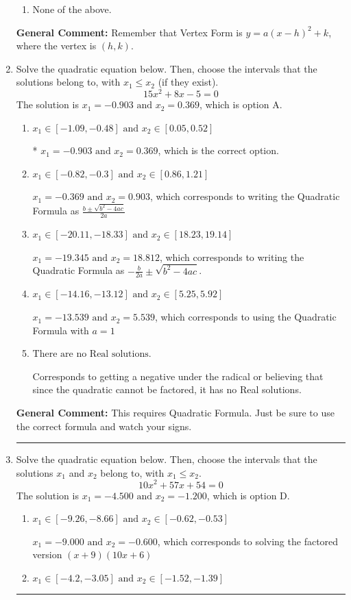 \documentclass{extbook}[14pt]
\newcommand{\litem}[1]{\item #1

\rule{\textwidth}{0.4pt}}
\begin{document}
\begin{enumerate}
{\begin{enumerate}[label=\Alph*.]
\begin{multicols}{2}
\end{multicols}\item None of the above.\end{enumerate}
\textbf{General Comment:} Remember that Vertex Form is $y = a(x-h)^2+k$, where the vertex is $(h, k)$.
}
\litem{
Solve the quadratic equation below. Then, choose the intervals that the solutions belong to, with $x_1 \leq x_2$ (if they exist).
\[ 15x^{2} +8 x -5 = 0 \]The solution is \( x_1 = -0.903 \text{ and } x_2 = 0.369 \), which is option A.\begin{enumerate}[label=\Alph*.]
\item \( x_1 \in [-1.09, -0.48] \text{ and } x_2 \in [0.05, 0.52] \)

* $x_1 = -0.903 \text{ and } x_2 = 0.369$, which is the correct option.
\item \( x_1 \in [-0.82, -0.3] \text{ and } x_2 \in [0.86, 1.21] \)

 $x_1 = -0.369 \text{ and } x_2 = 0.903$, which corresponds to writing the Quadratic Formula as $\frac{b \pm \sqrt{b^2 - 4ac}}{2a}$
\item \( x_1 \in [-20.11, -18.33] \text{ and } x_2 \in [18.23, 19.14] \)

 $x_1 = -19.345 \text{ and } x_2 = 18.812$, which corresponds to writing the Quadratic Formula as $-\frac{b}{2a} \pm \sqrt{b^2 - 4ac}$.
\item \( x_1 \in [-14.16, -13.12] \text{ and } x_2 \in [5.25, 5.92] \)

 $x_1 = -13.539 \text{ and } x_2 = 5.539$, which corresponds to using the Quadratic Formula with $a=1$
\item \( \text{There are no Real solutions.} \)

Corresponds to getting a negative under the radical or believing that since the quadratic cannot be factored, it has no Real solutions.
\end{enumerate}

\textbf{General Comment:} This requires Quadratic Formula. Just be sure to use the correct formula and watch your signs.
}
\litem{
Solve the quadratic equation below. Then, choose the intervals that the solutions $x_1$ and $x_2$ belong to, with $x_1 \leq x_2$.
\[ 10x^{2} +57 x + 54 = 0 \]The solution is \( x_1 = -4.500 \text{ and } x_2 = -1.200 \), which is option D.\begin{enumerate}[label=\Alph*.]
\item \( x_1 \in [-9.26, -8.66] \text{ and } x_2 \in [-0.62, -0.53] \)

$x_1 = -9.000 \text{ and } x_2 = -0.600$, which corresponds to solving the factored version $(x + 9)(10x + 6)$
\item \( x_1 \in [-4.2, -3.05] \text{ and } x_2 \in [-1.52, -1.39] \)


\end{enumerate}}
\end{enumerate}
\end{document}
